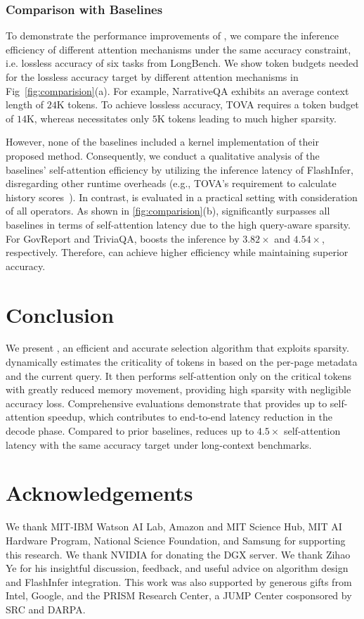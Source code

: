 \subsubsection{Comparison with Baselines}
\label{sec:eval:comparison}
To demonstrate the performance improvements of \method{}, we compare the inference efficiency of different attention mechanisms under the same accuracy constraint, i.e. lossless accuracy of six tasks from LongBench. We show token budgets needed for the lossless accuracy target by different attention mechanisms in Fig~\ref{fig:comparision}(a). For example, NarrativeQA exhibits an average context length of $24$K tokens. To achieve lossless accuracy, TOVA requires a token budget of $14$K, whereas \method{} necessitates only $5$K tokens leading to much higher sparsity.

However, none of the baselines included a kernel implementation of their proposed method. Consequently, we conduct a qualitative analysis of the baselines' self-attention efficiency by utilizing the inference latency of FlashInfer, disregarding other runtime overheads (e.g., TOVA's requirement to calculate history scores~\cite{oren2024transformers}). In contrast, \method{} is evaluated in a practical setting with consideration of all operators. As shown in \fig\ref{fig:comparision}(b), \method{} significantly surpasses all baselines in terms of self-attention latency due to the high query-aware sparsity. For GovReport and TriviaQA, \method{} boosts the inference by $3.82\times$ and $4.54\times$, respectively. Therefore, \method{} can achieve higher efficiency while maintaining superior accuracy.
\section{Conclusion}
We present \method, an efficient and accurate \kvc{} selection algorithm that exploits \qaware{} sparsity. \method{} dynamically estimates the criticality of tokens in \kvc{} based on the per-page metadata and the current query. It then performs self-attention only on the critical tokens with greatly reduced memory movement, providing high sparsity with negligible accuracy loss. Comprehensive evaluations demonstrate that \method provides up to \selfspeedup self-attention speedup, which contributes to \eespeedup end-to-end latency reduction in the decode phase. Compared to prior baselines, \method{} reduces up to $4.5\times$ self-attention latency with the same accuracy target under long-context benchmarks.

\section*{Acknowledgements}
We thank MIT-IBM Watson AI Lab, Amazon and MIT Science Hub, MIT AI Hardware Program, National Science Foundation, and Samsung for supporting this research. We thank NVIDIA for donating the DGX server. 
We thank Zihao Ye for his insightful discussion, feedback, and useful advice on algorithm design and FlashInfer integration. This work was also supported by
generous gifts from Intel, Google, and the PRISM Research Center, a JUMP Center cosponsored by SRC and DARPA.

